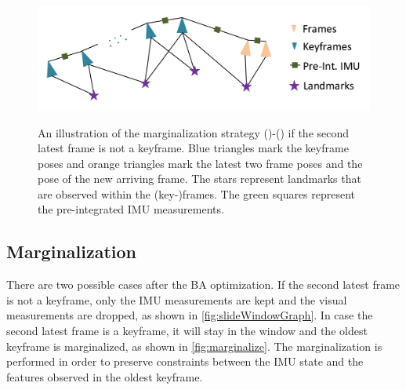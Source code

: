 \begin{figure}[h!]
\begin{minipage}[b]{1\linewidth}
\centering\large 
  \includegraphics[width=1\textwidth]{images/throw_3.png}
\label{fig:slideWindowGraph_c}
\end{minipage}%
  \caption{An illustration of the marginalization strategy 
()-() if the
second latest frame is not a keyframe. Blue triangles mark the keyframe poses 
and orange triangles mark the latest two frame poses and the pose of the new 
arriving frame. The stars represent landmarks that are observed within the 
(key-)frames. The green squares represent the pre-integrated \ac{IMU} 
measurements.}
  \label{fig:slideWindowGraph}
\end{figure}



\subsection{Marginalization}
\label{subsec:marginalization}
There are two possible cases after the \ac{BA} optimization. If the second 
latest frame is not a keyframe, only the \ac{IMU} measurements are kept and the 
visual measurements are dropped, as shown in \autoref{fig:slideWindowGraph}. 
In case the second latest frame is a keyframe, it will stay in the window and 
the oldest keyframe is marginalized, as shown in \autoref{fig:marginalize}. The 
marginalization is performed in order to preserve constraints between the 
\ac{IMU} state and the features observed in the oldest keyframe. \\


